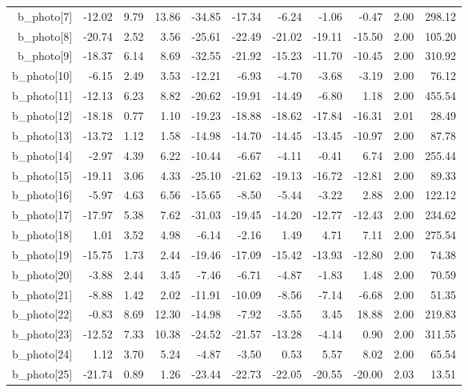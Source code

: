 \documentclass[11pt]{article}
\begin{document}
\begin{table}[ht]
\begin{tabular}{rrrrrrrrrrr}
  b\_photo[7] & -12.02 & 9.79 & 13.86 & -34.85 & -17.34 & -6.24 & -1.06 & -0.47 & 2.00 & 298.12 \\ 
  b\_photo[8] & -20.74 & 2.52 & 3.56 & -25.61 & -22.49 & -21.02 & -19.11 & -15.50 & 2.00 & 105.20 \\ 
  b\_photo[9] & -18.37 & 6.14 & 8.69 & -32.55 & -21.92 & -15.23 & -11.70 & -10.45 & 2.00 & 310.92 \\ 
  b\_photo[10] & -6.15 & 2.49 & 3.53 & -12.21 & -6.93 & -4.70 & -3.68 & -3.19 & 2.00 & 76.12 \\ 
  b\_photo[11] & -12.13 & 6.23 & 8.82 & -20.62 & -19.91 & -14.49 & -6.80 & 1.18 & 2.00 & 455.54 \\ 
  b\_photo[12] & -18.18 & 0.77 & 1.10 & -19.23 & -18.88 & -18.62 & -17.84 & -16.31 & 2.01 & 28.49 \\ 
  b\_photo[13] & -13.72 & 1.12 & 1.58 & -14.98 & -14.70 & -14.45 & -13.45 & -10.97 & 2.00 & 87.78 \\ 
  b\_photo[14] & -2.97 & 4.39 & 6.22 & -10.44 & -6.67 & -4.11 & -0.41 & 6.74 & 2.00 & 255.44 \\ 
  b\_photo[15] & -19.11 & 3.06 & 4.33 & -25.10 & -21.62 & -19.13 & -16.72 & -12.81 & 2.00 & 89.33 \\ 
  b\_photo[16] & -5.97 & 4.63 & 6.56 & -15.65 & -8.50 & -5.44 & -3.22 & 2.88 & 2.00 & 122.12 \\ 
  b\_photo[17] & -17.97 & 5.38 & 7.62 & -31.03 & -19.45 & -14.20 & -12.77 & -12.43 & 2.00 & 234.62 \\ 
  b\_photo[18] & 1.01 & 3.52 & 4.98 & -6.14 & -2.16 & 1.49 & 4.71 & 7.11 & 2.00 & 275.54 \\ 
  b\_photo[19] & -15.75 & 1.73 & 2.44 & -19.46 & -17.09 & -15.42 & -13.93 & -12.80 & 2.00 & 74.38 \\ 
  b\_photo[20] & -3.88 & 2.44 & 3.45 & -7.46 & -6.71 & -4.87 & -1.83 & 1.48 & 2.00 & 70.59 \\ 
  b\_photo[21] & -8.88 & 1.42 & 2.02 & -11.91 & -10.09 & -8.56 & -7.14 & -6.68 & 2.00 & 51.35 \\ 
  b\_photo[22] & -0.83 & 8.69 & 12.30 & -14.98 & -7.92 & -3.55 & 3.45 & 18.88 & 2.00 & 219.83 \\ 
  b\_photo[23] & -12.52 & 7.33 & 10.38 & -24.52 & -21.57 & -13.28 & -4.14 & 0.90 & 2.00 & 311.55 \\ 
  b\_photo[24] & 1.12 & 3.70 & 5.24 & -4.87 & -3.50 & 0.53 & 5.57 & 8.02 & 2.00 & 65.54 \\ 
  b\_photo[25] & -21.74 & 0.89 & 1.26 & -23.44 & -22.73 & -22.05 & -20.55 & -20.00 & 2.03 & 13.51 \\ 

\end{tabular}
\end{table}
\end{document}
